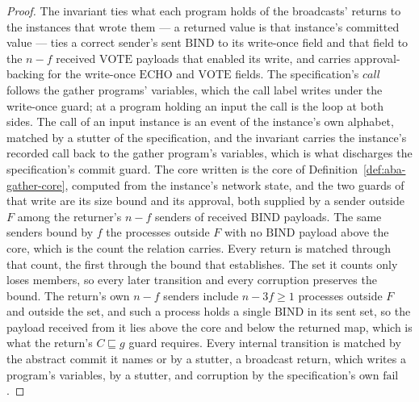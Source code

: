 \begin{proof}\leanok
  The invariant ties what each program holds of the broadcasts' returns to the instances that wrote them --- a returned value is that instance's committed value --- ties a correct sender's sent $\mathrm{BIND}$ to its write-once field and that field to the $n - f$ received $\mathrm{VOTE}$ payloads that enabled its write, and carries approval-backing for the write-once $\mathrm{ECHO}$ and $\mathrm{VOTE}$ fields.
  The specification's $call$ follows the gather programs' variables, which the call label writes under the write-once guard; at a program holding an input the call is the loop at both sides.
  The call of an input instance is an event of the instance's own alphabet, matched by a stutter of the specification, and the invariant carries the instance's recorded call back to the gather program's variables, which is what discharges the specification's commit guard.
  The core written is the core of Definition~\ref{def:aba-gather-core}, computed from the instance's network state, and the two guards of that write are its size bound and its approval, both supplied by a sender outside $F$ among the returner's $n - f$ senders of received $\mathrm{BIND}$ payloads.
  The same senders bound by $f$ the processes outside $F$ with no $\mathrm{BIND}$ payload above the core, which is the count the relation carries.
  Every return is matched through that count, the first through the bound that  establishes.
  The set it counts only loses members, so every later transition and every corruption preserves the bound.
  The return's own $n{-}f$ senders include $n - 3f \ge 1$ processes outside $F$ and outside the set, and such a process holds a single $\mathrm{BIND}$ in its sent set, so the payload received from it lies above the core and below the returned map, which is what the return's $C \sqsubseteq g$ guard requires.
  Every internal transition is matched by the abstract commit it names or by a stutter, a broadcast return, which writes a program's variables, by a stutter, and corruption by the specification's own $\mathrm{fail}$.
\end{proof}
